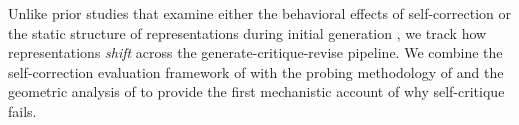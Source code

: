 Unlike prior studies that examine either the behavioral effects of self-correction \cite{huang2024selfcorrect,madaan2023selfrefine} or the static structure of representations during initial generation \cite{marks2024geometry,garner2025probing,david2025temporal}, we track how representations \emph{shift} across the generate-critique-revise pipeline. We combine the self-correction evaluation framework of \citet{huang2024selfcorrect} with the probing methodology of \citet{marks2024geometry} and the geometric analysis of \citet{anderson2026geometry} to provide the first mechanistic account of why self-critique fails.
